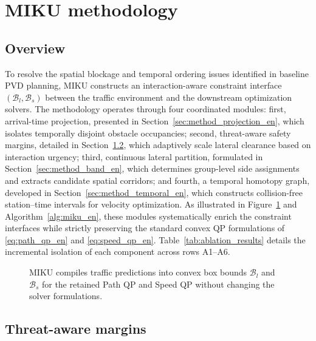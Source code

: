 \section{MIKU methodology}
\label{sec:method}

\subsection{Overview}

To resolve the spatial blockage and temporal ordering issues identified in baseline PVD planning, MIKU constructs an interaction-aware constraint interface $(\mathcal{B}_l, \mathcal{B}_s)$ between the traffic environment and the downstream optimization solvers. The methodology operates through four coordinated modules:
first, arrival-time projection, presented in Section~\ref{sec:method_projection_en}, which isolates temporally disjoint obstacle occupancies;
second, threat-aware safety margins, detailed in Section~\ref{sec:method_threat_en}, which adaptively scale lateral clearance based on interaction urgency;
third, continuous lateral partition, formulated in Section~\ref{sec:method_band_en}, which determines group-level side assignments and extracts candidate spatial corridors; and
fourth, a temporal homotopy graph, developed in Section~\ref{sec:method_temporal_en}, which constructs collision-free station--time intervals for velocity optimization.
As illustrated in Figure~\ref{fig:miku_flow_en} and Algorithm~\ref{alg:miku_en}, these modules systematically enrich the constraint interfaces while strictly preserving the standard convex QP formulations of \eqref{eq:path_qp_en} and \eqref{eq:speed_qp_en}. Table~\ref{tab:ablation_results} details the incremental isolation of each component across rows A1--A6.

\begin{figure}
\centering
{}
\caption{MIKU compiles traffic predictions into convex box bounds $\mathcal{B}_l$ and $\mathcal{B}_s$ for the retained Path QP and Speed QP without changing the solver formulations.}
\label{fig:miku_flow_en}
\end{figure}

\subsection{Threat-aware margins}
\label{sec:method_threat_en}


